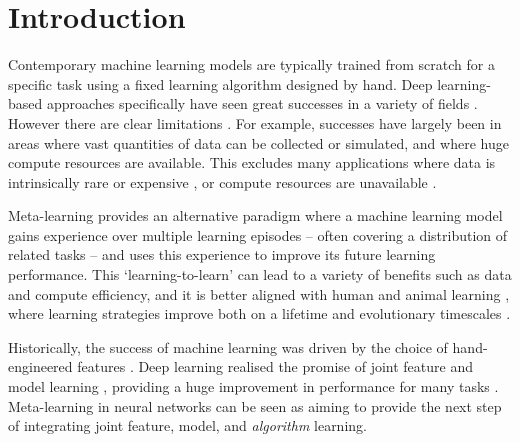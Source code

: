 \documentclass[10pt,journal,compsoc]{IEEEtran}
\begin{document}
\maketitle
\IEEEdisplaynontitleabstractindextext
\IEEEpeerreviewmaketitle

\section{Introduction}\label{sec:introduction}

Contemporary machine learning models are typically trained from scratch for a specific task using a fixed learning algorithm designed by hand. Deep learning-based approaches specifically have seen great successes in a variety of fields \cite{he2016resnet,silver2016mastering,devlin2019bert}. However there are clear limitations \cite{marcus2018deepcritical}. For example, successes have largely been in areas where vast quantities of data can be collected or simulated, and where huge compute resources are available. This excludes many applications where data is intrinsically rare or expensive \cite{altae2016oneshotdrugdiscovery}, or compute resources are unavailable \cite{ignatov2019aismartphone}.

Meta-learning provides an alternative paradigm where a machine learning model gains experience over multiple learning episodes -- often covering a distribution of related tasks -- and uses this experience to improve its future learning performance. 
This `learning-to-learn' \cite{thrun1998learning} can lead to a variety of benefits such as data and compute efficiency, and it is better aligned with human and animal learning \cite{harlow1949formation}, where learning strategies improve both on a lifetime and evolutionary timescales \cite{biggs1985metarole,harlow1949formation,schrier1984learning}.

Historically, the success of machine learning was driven by the choice of hand-engineered features \cite{domingos2012usefulml, lowe2004sift}. Deep learning realised the promise of joint feature and model learning \cite{krizhevsky2012imagenetdeepcnn}, providing a huge improvement in performance for many tasks \cite{he2016resnet,devlin2019bert}. Meta-learning in neural networks can be seen as aiming to provide the next step of integrating joint feature, model, and \emph{algorithm} learning.
\end{document}
